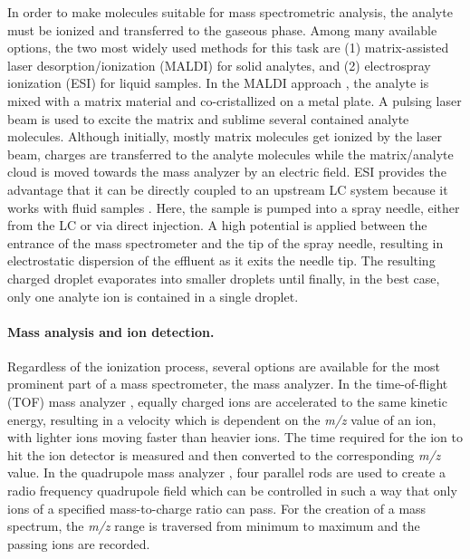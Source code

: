 In order to make molecules suitable for mass spectrometric analysis, 
the analyte must be ionized and transferred to the gaseous phase.
Among many available options, the two most widely used methods for this 
task are (1) matrix-assisted laser desorption/ionization (MALDI) for solid 
analytes, and (2) electrospray ionization (ESI) for liquid samples.
In the MALDI approach \citep{Karas1988}, the analyte is mixed with a 
matrix material and co-cristallized on a metal plate. 
A pulsing laser beam is used to excite the matrix and sublime several 
contained analyte molecules. 
Although initially, mostly matrix molecules get ionized by the laser
beam, charges are transferred to the analyte molecules while the
matrix/analyte cloud is moved towards the mass analyzer by an
electric field.
ESI provides the advantage that it can be directly coupled to an
upstream LC system because it works with fluid samples \citep{Fenn1989}.
Here, the sample is pumped into a spray needle, either from the LC or via
direct injection. 
A high potential is applied between the entrance of the mass spectrometer and
the tip of the spray needle, resulting in electrostatic dispersion of the
effluent as it exits the needle tip.
The resulting charged droplet evaporates into smaller droplets until finally,
in the best case, only one analyte ion is contained in a single droplet.

\paragraph{Mass analysis and ion detection.}

Regardless of the ionization process, several options are available for
the most prominent part of a mass spectrometer, the mass analyzer.
In the time-of-flight (TOF) mass analyzer \citep{Wolff1953}, equally charged 
ions are accelerated to the same kinetic energy, resulting in a velocity 
which is dependent on the {\em m/z} value of an ion, with lighter ions
moving faster than heavier ions.
The time required for the ion to hit the ion detector is measured and
then converted to the corresponding {\em m/z} value.
In the quadrupole mass analyzer \citep{Paul1956}, four parallel rods are 
used to create a radio frequency quadrupole field which can be controlled
in such a way that only ions of a specified mass-to-charge ratio can pass.
For the creation of a mass spectrum, the {\em m/z} range is traversed from
minimum to maximum and the passing ions are recorded.


